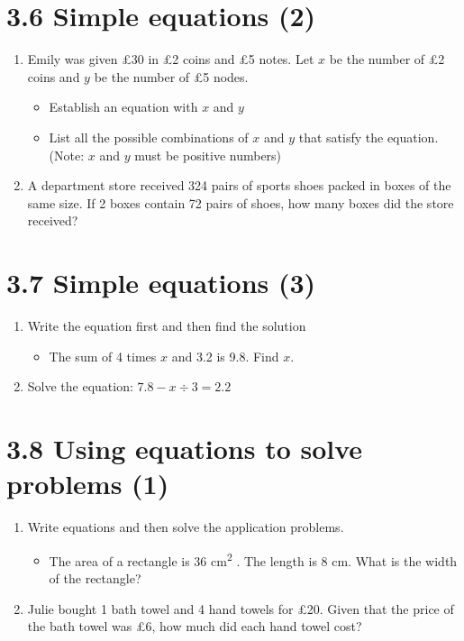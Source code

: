 \documentclass{article}%
\begin{document}
%
\section*{3.6 Simple equations (2)}%
\begin{enumerate}%
\item%
Emily was given \pounds30 in \pounds2 coins and \pounds5 notes. Let $x$ be the number of \pounds2 coins and $y$ be the number of \pounds5 nodes.%
\begin{itemize}%
\item%
Establish an equation with $x$ and $y$%
\item%
List all the possible combinations of $x$ and $y$ that satisfy the equation. (Note: $x$ and $y$ must be positive numbers)%
\end{itemize}%
\item%
A department store received 324 pairs of sports shoes packed in boxes of the same size. If 2 boxes contain 72 pairs of shoes, how many boxes did the store received?%
\end{enumerate}

%
\section*{3.7 Simple equations (3)}%
\begin{enumerate}%
\item%
Write the equation first and then find the solution%
\begin{itemize}%
\item%
The sum of 4 times $x$ and 3.2 is 9.8. Find $x$.%
\end{itemize}%
\item%
Solve the equation: $7.8-x\div3=2.2$%
\end{enumerate}

%
\section*{3.8 Using equations to solve problems (1)}%
\begin{enumerate}%
\item%
Write equations and then solve the application problems.%
\begin{itemize}%
\item%
The area of a rectangle is 36 cm\textsuperscript{2} . The length is 8 cm. What is the width of the rectangle?%
\end{itemize}%
\item%
Julie bought 1 bath towel and 4 hand towels for \pounds20. Given that the price of the bath towel was \pounds6, how much did each hand towel cost?%
\end{enumerate}

%
\end{document}
